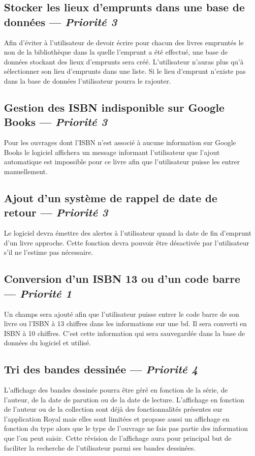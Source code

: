\subsection[Stocker les lieux d'emprunts dans une base de données]{Stocker les lieux d'emprunts dans une base de données — \emph{Priorité 3}}
Afin d'éviter à l'utilisateur de devoir écrire pour chacun des livres empruntés le non de la bibliothèque dans la quelle l'emprunt a été effectué, une base de données stockant des lieux d'emprunts sera créé. 
L'utilisateur n'auras plus qu'à sélectionner son lieu d'emprunts dans une liste. 
Si le lieu d'emprunt n'existe pas dans la base de données l'utilisateur pourra le rajouter.

\subsection[Gestion des ISBN indisponible sur Google Books]{Gestion des ISBN indisponible sur Google Books — \emph{Priorité 3}}
Pour les ouvrages dont l'ISBN n'est associé à aucune information sur Google Books le logiciel affichera un message informant l'utilisateur que l'ajout automatique est impossible pour ce livre afin que l'utilisateur puisse les entrer manuellement.   

\subsection[Ajout d'un système de rappel de date de retour]{Ajout d'un système de rappel de date de retour — \emph{Priorité 3}}
Le logiciel devra émettre des alertes à l'utilisateur quand la date de fin d'emprunt d'un livre approche. 
Cette fonction devra pouvoir être désactivée par l'utilisateur s'il ne l'estime pas nécessaire.

\subsection[Conversion d'un ISBN 13 ou code barre]{Conversion d'un ISBN 13 ou d'un code barre — \emph{Priorité 1}}
Un champs sera ajouté afin que l'utilisateur puisse entrer le code barre de son livre ou l'ISBN à 13 chiffres dans les informations sur une bd. Il sera converti en ISBN à 10 chiffres. C'est cette information qui sera sauvegardée dans la base de données du logiciel et utilisé.


\subsection[Tri des bandes dessinée]{Tri des bandes dessinée — \emph{Priorité 4}}
L'affichage des bandes dessinée pourra être géré en fonction de la série, de l'auteur, de la date de parution ou de la date de lecture. 
L'affichage en fonction de l'auteur ou de la collection sont déjà des fonctionnalités présentes sur l'application Royal mais elles sont limitées et propose aussi un affichage en fonction du type alors que le type de l'ouvrage ne fais pas partie des information que l'on peut saisir. 
Cette révision de l'affichage aura pour principal but de faciliter la recherche de l'utilisateur parmi ses bandes dessinées.

